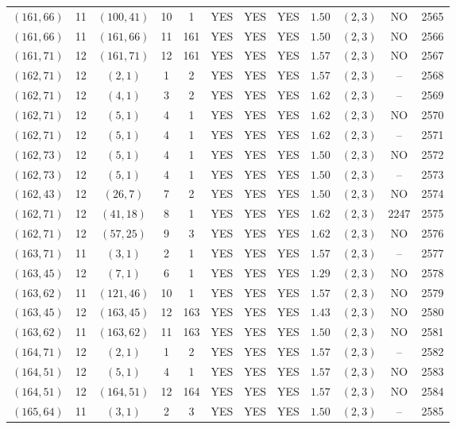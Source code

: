 \begin{longtable}{|c|c|c|c|c|c|c|c|c|c|c|c|}
$(161,66)$ & 11 & $(100,41)$ & 10 & 1 & YES & YES & YES & $1.50$ & $(2,3)$ & NO & 2565\\
$(161,66)$ & 11 & $(161,66)$ & 11 & 161 & YES & YES & YES & $1.50$ & $(2,3)$ & NO & 2566\\
$(161,71)$ & 12 & $(161,71)$ & 12 & 161 & YES & YES & YES & $1.57$ & $(2,3)$ & NO & 2567\\
$(162,71)$ & 12 & $(2,1)$ & 1 & 2 & YES & YES & YES & $1.57$ & $(2,3)$ & -- & 2568\\
$(162,71)$ & 12 & $(4,1)$ & 3 & 2 & YES & YES & YES & $1.62$ & $(2,3)$ & -- & 2569\\
$(162,71)$ & 12 & $(5,1)$ & 4 & 1 & YES & YES & YES & $1.62$ & $(2,3)$ & NO & 2570\\
$(162,71)$ & 12 & $(5,1)$ & 4 & 1 & YES & YES & YES & $1.62$ & $(2,3)$ & -- & 2571\\
$(162,73)$ & 12 & $(5,1)$ & 4 & 1 & YES & YES & YES & $1.50$ & $(2,3)$ & NO & 2572\\
$(162,73)$ & 12 & $(5,1)$ & 4 & 1 & YES & YES & YES & $1.50$ & $(2,3)$ & -- & 2573\\
$(162,43)$ & 12 & $(26,7)$ & 7 & 2 & YES & YES & YES & $1.50$ & $(2,3)$ & NO & 2574\\
$(162,71)$ & 12 & $(41,18)$ & 8 & 1 & YES & YES & YES & $1.62$ & $(2,3)$ & 2247 & 2575\\
$(162,71)$ & 12 & $(57,25)$ & 9 & 3 & YES & YES & YES & $1.62$ & $(2,3)$ & NO & 2576\\
$(163,71)$ & 11 & $(3,1)$ & 2 & 1 & YES & YES & YES & $1.57$ & $(2,3)$ & -- & 2577\\
$(163,45)$ & 12 & $(7,1)$ & 6 & 1 & YES & YES & YES & $1.29$ & $(2,3)$ & NO & 2578\\
$(163,62)$ & 11 & $(121,46)$ & 10 & 1 & YES & YES & YES & $1.57$ & $(2,3)$ & NO & 2579\\
$(163,45)$ & 12 & $(163,45)$ & 12 & 163 & YES & YES & YES & $1.43$ & $(2,3)$ & NO & 2580\\
$(163,62)$ & 11 & $(163,62)$ & 11 & 163 & YES & YES & YES & $1.50$ & $(2,3)$ & NO & 2581\\
$(164,71)$ & 12 & $(2,1)$ & 1 & 2 & YES & YES & YES & $1.57$ & $(2,3)$ & -- & 2582\\
$(164,51)$ & 12 & $(5,1)$ & 4 & 1 & YES & YES & YES & $1.57$ & $(2,3)$ & NO & 2583\\
$(164,51)$ & 12 & $(164,51)$ & 12 & 164 & YES & YES & YES & $1.57$ & $(2,3)$ & NO & 2584\\
$(165,64)$ & 11 & $(3,1)$ & 2 & 3 & YES & YES & YES & $1.50$ & $(2,3)$ & -- & 2585\\

\end{longtable}
